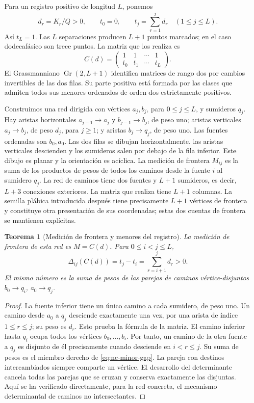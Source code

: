 \documentclass[a4paper,10pt]{article}
\newtheorem{theorem}{Teorema}[section]
\theoremstyle{definition}\newtheorem{definition}[theorem]{Definición}
\theoremstyle{remark}\newtheorem{remark}[theorem]{Observación}
\numberwithin{equation}{section}
\begin{document}
Para un registro positivo de longitud \(L\), ponemos
\[
 d_r=K_r/Q>0,\qquad t_0=0,\qquad
 t_j=\sum_{r=1}^jd_r\quad(1\le j\le L).
\]
Así \(t_L=1\). Las \(L\) separaciones producen \(L+1\) puntos marcados;
en el caso dodecafásico son trece puntos. La matriz que los realiza es
\begin{equation}
 C(d)=\begin{pmatrix}1&1&\cdots&1\\t_0&t_1&\cdots&t_L\end{pmatrix}.
 \label{eq:nc-path-matrix}
\end{equation}
El Grassmanniano \(\operatorname{Gr}(2,L+1)\) identifica matrices de rango
dos por cambios invertibles de las dos filas. Su parte positiva está formada
por las clases que admiten todos sus menores ordenados de orden dos
estrictamente positivos.

Construimos una red dirigida con vértices \(a_j,b_j\), para
\(0\le j\le L\), y sumideros \(q_j\). Hay aristas horizontales
\(a_{j-1}\to a_j\) y \(b_{j-1}\to b_j\), de peso uno; aristas verticales
\(a_j\to b_j\), de peso \(d_j\), para \(j\ge1\); y aristas
\(b_j\to q_j\), de peso uno. Las fuentes ordenadas son \(b_0,a_0\).
Las dos filas se dibujan horizontalmente, las aristas verticales descienden
y los sumideros salen por debajo de la fila inferior. Este dibujo es planar
y la orientación es acíclica. La medición de frontera \(M_{ij}\) es la
suma de los productos de pesos de todos los caminos desde la fuente \(i\)
al sumidero \(q_j\).
La red de caminos tiene dos fuentes y \(L+1\) sumideros, es decir,
\(L+3\) conexiones exteriores. La matriz que realiza tiene \(L+1\)
columnas. La semilla plábica introducida después tiene precisamente
\(L+1\) vértices de frontera y constituye otra presentación de sus
coordenadas; estas dos cuentas de frontera se mantienen explícitas.

\begin{theorem}[Medición de frontera y menores del registro]
\label{thm:nc-network}
La medición de frontera de esta red es \(M=C(d)\). Para
\(0\le i<j\le L\),
\begin{equation}
 \Delta_{ij}(C(d))=t_j-t_i=\sum_{r=i+1}^{j}d_r>0.
 \label{eq:nc-minor-gap}
\end{equation}
El mismo número es la suma de pesos de las parejas de caminos
vértice-disjuntos \(b_0\to q_i\), \(a_0\to q_j\).
\end{theorem}
\begin{proof}
La fuente inferior tiene un único camino a cada sumidero, de peso uno.
Un camino desde \(a_0\) a \(q_j\) desciende exactamente una vez, por una
arista de índice \(1\le r\le j\); su peso es \(d_r\). Esto prueba la
fórmula de la matriz. El camino inferior hasta \(q_i\) ocupa todos los
vértices \(b_0,\ldots,b_i\). Por tanto, un camino de la otra fuente a
\(q_j\) es disjunto de él precisamente cuando desciende en
\(i<r\le j\). Su suma de pesos es el miembro derecho de
\eqref{eq:nc-minor-gap}. La pareja con destinos intercambiados siempre
comparte un vértice. El desarrollo del determinante cancela todas las
parejas que se cruzan y conserva exactamente las disjuntas. Aquí se ha
verificado directamente, para la red concreta, el mecanismo determinantal
de caminos no intersectantes.
\end{proof}
\end{document}
